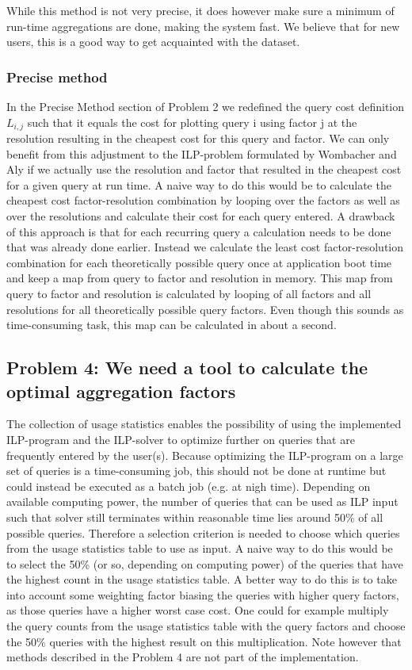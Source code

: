 While this method is not very precise, it does however make sure a minimum of run-time aggregations are done, making the system fast. We believe that for new users, this is a good way to get acquainted with the dataset.

\subsubsection{Precise method}
In the Precise Method section of Problem 2 we redefined the query cost definition $L_{i,j}$ such that it equals the cost for plotting query i using factor j at the resolution resulting in the cheapest cost for this query and factor. We can only benefit from this adjustment to the ILP-problem formulated by Wombacher and Aly \cite{wombacher2011} if we actually use the resolution and factor that resulted in the cheapest cost for a given query at run time. A naive way to do this would be to calculate the cheapest cost factor-resolution combination by looping over the factors as well as over the resolutions and calculate their cost for each query entered. A drawback of this approach is that for each recurring query a calculation needs to be done that was already done earlier. Instead we calculate the least cost factor-resolution combination for each theoretically possible query once at application boot time and keep a map from query to factor and resolution in memory. This map from query to factor and resolution is calculated by looping of all factors and all resolutions for all theoretically possible query factors. Even though this sounds as time-consuming task, this map can be calculated in about a second.

\subsection{Problem 4: We need a tool to calculate the optimal aggregation factors}
The collection of usage statistics enables the possibility of using the implemented ILP-program and the ILP-solver to optimize further on queries that are frequently entered by the user(s). Because optimizing the ILP-program on a large set of queries is a time-consuming job, this should not be done at runtime but could instead be executed as a batch job (e.g. at nigh time). Depending on available computing power, the number of queries that can be used as ILP input such that solver still terminates within reasonable time lies around 50\% of all possible queries. Therefore a selection criterion is needed to choose which queries from the usage statistics table to use as input. A naive way to do this would be to select the 50\% (or so, depending on computing power) of the queries that have the highest count in the usage statistics table. A better way to do this is to take into account some weighting factor biasing the queries with higher query factors, as those queries have a higher worst case cost. One could for example multiply the query counts from the usage statistics table with the query factors and choose the 50\% queries with the highest result on this multiplication. Note however that methods described in the Problem 4 are not part of the implementation.

